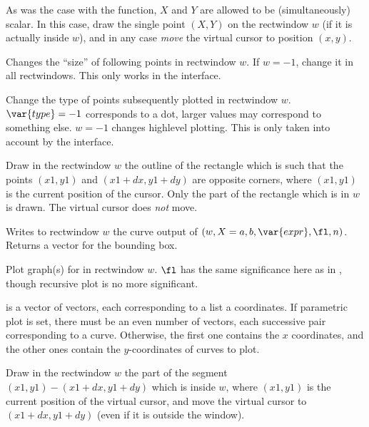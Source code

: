As was the case with the  function, $X$ and $Y$ are allowed to
be (simultaneously) scalar. In this case, draw the single point $(X,Y)$ on
the rectwindow $w$ (if it is actually inside $w$), and in any case
\emph{move} the virtual cursor to position $(x,y)$.

\label{se:plotpointsize}
Changes the ``size'' of following points in rectwindow $w$. If $w = -1$,
change it in all rectwindows. This only works in the  interface.

\label{se:plotpointtype}
Change the type of points subsequently plotted in rectwindow $w$.
$\var{type} = -1$ corresponds to a dot, larger values may correspond to
something else. $w = -1$ changes highlevel plotting. This is only taken into
account by the  interface.

\label{se:plotrbox}
Draw in the rectwindow $w$ the outline of the rectangle which is such
that the points $(x1,y1)$ and $(x1+dx,y1+dy)$ are opposite corners, where
$(x1,y1)$ is the current position of the cursor. Only the part of the
rectangle which is in $w$ is drawn. The virtual cursor does \emph{not} move.

\label{se:plotrecth}
Writes to rectwindow $w$ the curve output of
$(w,X=a,b,\var{expr},\fl,n)$. Returns a vector for the bounding box.

\label{se:plotrecthraw}
Plot graph(s) for
 in rectwindow $w$. $\fl$ has the same significance here as in
, though recursive plot is no more significant.

 is a vector of vectors, each corresponding to a list a coordinates.
If parametric plot is set, there must be an even number of vectors, each
successive pair corresponding to a curve. Otherwise, the first one contains
the $x$ coordinates, and the other ones contain the $y$-coordinates
of curves to plot.

\label{se:plotrline}
Draw in the rectwindow $w$ the part of the segment
$(x1,y1)-(x1+dx,y1+dy)$ which is inside $w$, where $(x1,y1)$ is the current
position of the virtual cursor, and move the virtual cursor to
$(x1+dx,y1+dy)$ (even if it is outside the window).

